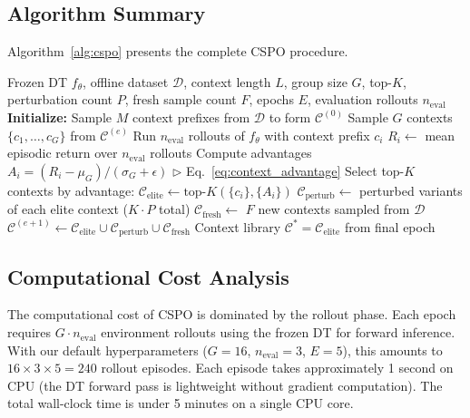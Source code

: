 \documentclass{article}
\newcommand{\cspo}{\textsc{CSPO}}
\newcommand{\cC}{\mathcal{C}}
\newcommand{\cD}{\mathcal{D}}
\begin{document}
\subsection{Algorithm Summary}

Algorithm~\ref{alg:cspo} presents the complete \cspo{} procedure.

\begin{algorithm}[t]
\caption{Context-Space Policy Optimization (\cspo{})}
\label{alg:cspo}
\begin{algorithmic}[1]
\REQUIRE Frozen DT $f_\theta$, offline dataset $\cD$, context length $L$, group size $G$, top-$K$, perturbation count $P$, fresh sample count $F$, epochs $E$, evaluation rollouts $n_{\text{eval}}$
\STATE \textbf{Initialize:} Sample $M$ context prefixes from $\cD$ to form $\cC^{(0)}$
    \STATE Sample $G$ contexts $\{c_1, \ldots, c_G\}$ from $\cC^{(e)}$
        \STATE Run $n_{\text{eval}}$ rollouts of $f_\theta$ with context prefix $c_i$
        \STATE $R_i \leftarrow$ mean episodic return over $n_{\text{eval}}$ rollouts
    \ENDFOR
    \STATE Compute advantages $A_i = (R_i - \mu_G) / (\sigma_G + \epsilon)$ \hfill $\triangleright$ Eq.~\eqref{eq:context_advantage}
    \STATE Select top-$K$ contexts by advantage: $\cC_{\text{elite}} \leftarrow \text{top-}K(\{c_i\}, \{A_i\})$
    \STATE $\cC_{\text{perturb}} \leftarrow$ perturbed variants of each elite context ($K \cdot P$ total)
    \STATE $\cC_{\text{fresh}} \leftarrow$ $F$ new contexts sampled from $\cD$
    \STATE $\cC^{(e+1)} \leftarrow \cC_{\text{elite}} \cup \cC_{\text{perturb}} \cup \cC_{\text{fresh}}$
\ENDFOR
\RETURN Context library $\cC^* = \cC_{\text{elite}}$ from final epoch
\end{algorithmic}
\end{algorithm}

\subsection{Computational Cost Analysis}
\label{sec:method_cost}

The computational cost of \cspo{} is dominated by the rollout phase. Each epoch requires $G \cdot n_{\text{eval}}$ environment rollouts using the frozen DT for forward inference. With our default hyperparameters ($G = 16$, $n_{\text{eval}} = 3$, $E = 5$), this amounts to $16 \times 3 \times 5 = 240$ rollout episodes. Each episode takes approximately 1 second on CPU (the DT forward pass is lightweight without gradient computation). The total wall-clock time is under 5 minutes on a single CPU core.
\end{document}
